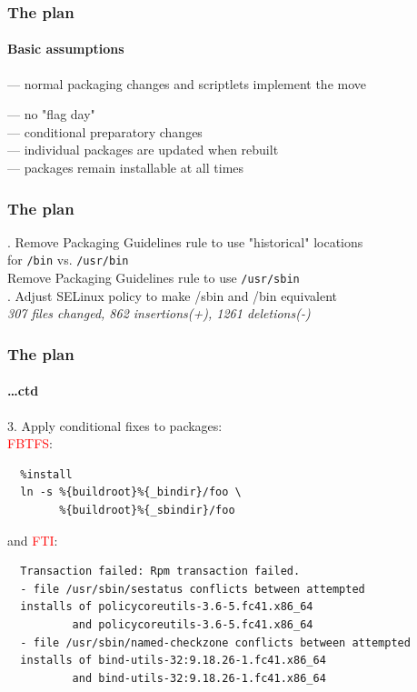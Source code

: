 \documentclass[]{beamer}
\newcommand\pp\pause
\begin{document}
\begin{frame}
  \frametitle{The plan}
  \framesubtitle{Basic assumptions}

  \pp
  — normal packaging changes and scriptlets implement the move
  \\\pp

  — no "flag day"
  \\\pp
  \phantom{—} — conditional preparatory changes%
  \\\pp
  \phantom{—} — individual packages are updated when rebuilt
  \\\pp
  \phantom{—} — packages remain installable at all times
\end{frame}

\begin{frame}[fragile]
  \frametitle{The plan}

  \pp
  1. Remove Packaging Guidelines rule to use "historical" locations\\
     \hspace*{5em} for \texttt{/bin} vs. \texttt{/usr/bin}\\
     Remove Packaging Guidelines rule to use \texttt{/usr/sbin}
  \\

  \pp
  2. Adjust SELinux policy to make /sbin and /bin equivalent\\
  \textit{307 files changed, 862 insertions(+), 1261 deletions(-)}

  \hfill
\end{frame}

\begin{frame}[fragile]
  \frametitle{The plan}
  \framesubtitle{…ctd}

  3. Apply conditional fixes to packages:\\
  \textcolor{red}{FBTFS}:{\small
  \begin{verbatim}
  %install
  ln -s %{buildroot}%{_bindir}/foo \
        %{buildroot}%{_sbindir}/foo
  \end{verbatim}
  }
  and \textcolor{red}{FTI}:{\small
  \begin{verbatim}
  Transaction failed: Rpm transaction failed.
  - file /usr/sbin/sestatus conflicts between attempted
  installs of policycoreutils-3.6-5.fc41.x86_64
          and policycoreutils-3.6-5.fc41.x86_64
  - file /usr/sbin/named-checkzone conflicts between attempted
  installs of bind-utils-32:9.18.26-1.fc41.x86_64
          and bind-utils-32:9.18.26-1.fc41.x86_64
  \end{verbatim}
  }

  \hfill
\end{frame}
\end{document}
